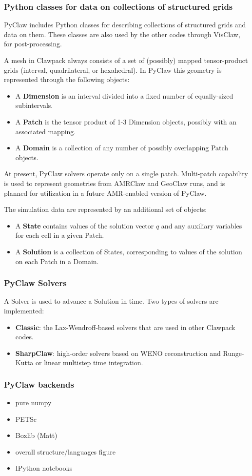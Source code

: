 \subsubsection{Python classes for data on collections of structured grids}
PyClaw includes Python classes for describing collections of structured grids
and data on them.
These classes are also used by the other codes through VisClaw, for post-processing.

A mesh in Clawpack always consists of a set of (possibly) mapped tensor-product
grids (interval, quadrilateral, or hexahedral).  In PyClaw this geometry is represented
through the following objects:
\begin{itemize}
    \item A {\bf Dimension} is an interval divided into a fixed number of equally-sized subintervals.
    \item A {\bf Patch} is the tensor product of 1-3 Dimension objects, possibly with an associated mapping.
    \item A {\bf Domain} is a collection of any number of possibly overlapping Patch objects.
\end{itemize}
At present, PyClaw solvers operate only on a single patch.  Multi-patch capability
is used to represent geometries from AMRClaw and GeoClaw runs, and is planned for
utilization in a future AMR-enabled version of PyClaw.

The simulation data are represented by an additional set of objects:
\begin{itemize}
    \item A {\bf State} contains values of the solution vector $q$ and any
        auxiliary variables for each cell in a given Patch.
    \item A {\bf Solution} is a collection of States, corresponding to values of the solution
        on each Patch in a Domain.
\end{itemize}

\subsubsection{PyClaw Solvers}
A Solver is used to advance a Solution in time.  Two types of solvers are implemented:
\begin{itemize}
    \item {\bf Classic}: the Lax-Wendroff-based solvers that are used in other Clawpack codes.
    \item {\bf SharpClaw}: high-order solvers based on WENO reconstruction and Runge-Kutta
        or linear multistep time integration.
\end{itemize}

\subsubsection{PyClaw backends}
\begin{itemize}
    \item pure numpy
    \item PETSc
    \item Boxlib (Matt)
\end{itemize}

\begin{itemize}
    \item overall structure/languages figure
    \item IPython notebooks
\end{itemize}
